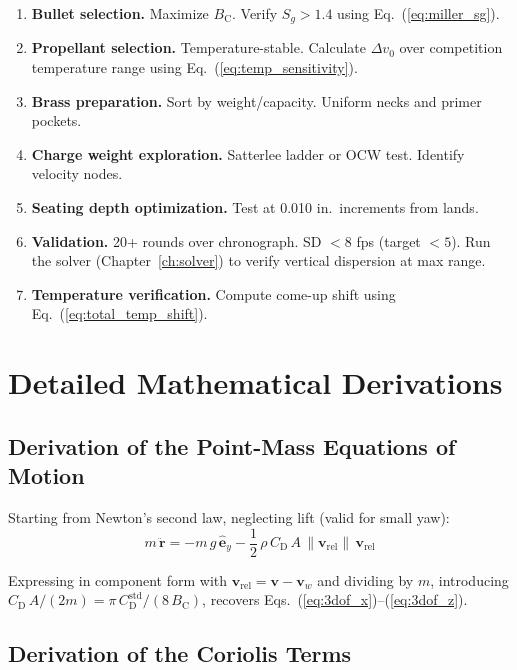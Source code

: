 \documentclass[11pt,twoside,openright]{report}
\newcommand{\Cd}{C_{\mathrm{D}}}
\newcommand{\Bc}{B_{\mathrm{C}}}
\newcommand{\vvec}{\bm{v}}
\newcommand{\rvec}{\bm{r}}
\begin{document}
\begin{enumerate}[label=\textbf{Step \arabic*:}]
  \item \textbf{Bullet selection.} Maximize $\Bc$. Verify $S_g > 1.4$ using Eq.~(\ref{eq:miller_sg}).
  \item \textbf{Propellant selection.} Temperature-stable. Calculate $\Delta v_0$ over competition temperature range using Eq.~(\ref{eq:temp_sensitivity}).
  \item \textbf{Brass preparation.} Sort by weight/capacity. Uniform necks and primer pockets.
  \item \textbf{Charge weight exploration.} Satterlee ladder or OCW test. Identify velocity nodes.
  \item \textbf{Seating depth optimization.} Test at 0.010 in.\ increments from lands.
  \item \textbf{Validation.} 20+ rounds over chronograph. SD $< 8$ fps (target $< 5$). Run the solver (Chapter~\ref{ch:solver}) to verify vertical dispersion at max range.
  \item \textbf{Temperature verification.} Compute come-up shift using Eq.~(\ref{eq:total_temp_shift}).
\end{enumerate}


\appendix

\chapter{Detailed Mathematical Derivations}
\label{app:derivations}

\section{Derivation of the Point-Mass Equations of Motion}

Starting from Newton's second law, neglecting lift (valid for small yaw):
\begin{equation}
  m\,\ddot{\rvec} = -m\,g\,\hat{\bm{e}}_y - \frac{1}{2}\,\rho\,\Cd\,A\,\|\vvec_{\mathrm{rel}}\|\,\vvec_{\mathrm{rel}}
\end{equation}

Expressing in component form with $\vvec_{\mathrm{rel}} = \vvec - \vvec_w$ and dividing by $m$, introducing $\Cd\,A/(2m) = \pi\,\Cd^{\mathrm{std}}/(8\,\Bc)$, recovers Eqs.~(\ref{eq:3dof_x})--(\ref{eq:3dof_z}).

\section{Derivation of the Coriolis Terms}
\end{document}
